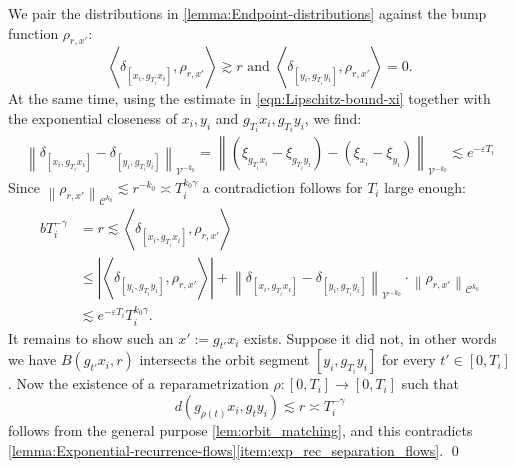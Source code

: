\documentclass[11pt]{amsart}
\newcommand \cC {\mathcal{C}}
\newcommand \cV {\mathcal{V}}
\newcommand{\ip}[1]{\left\langle#1\right\rangle}
\newcommand{\ve}{\varepsilon}
\newcommand{\leqapprox}{\lesssim}
\newcommand{\geqapprox}{\gtrsim}
\newcommand{\abs}[1]{\left|#1\right|}
\newcommand{\norm}[1]{\left\|#1\right\|}
\theoremstyle{mytheoremstyle}
\theoremstyle{mydefinitionstyle}
\theoremstyle{mytheoremstyle}
\numberwithin{equation}{section}
\theoremstyle{mydefinitionstyle}
\begin{document}
We pair the distributions in \autoref{lemma:Endpoint-distributions} against the bump function $\rho_{ r, x'}$:
\[
	\ip{\delta_{[x_i, g_{T_i}x_i]},\rho_{ r,x'}} \geqapprox r
	\text{ and }
	\ip{\delta_{[y_i, g_{T_i}y_i]},\rho_{ r,x'}} =0.
\]
At the same time, using the estimate in \autoref{eqn:Lipschitz-bound-xi} together with the exponential closeness of $x_i, y_i$ and $g_{T_i}x_i,g_{T_i}y_i$, we find:
\begin{align*}
	\norm{\delta_{[x_i,g_{T_i}x_i]} - \delta_{[y_i,g_{T_i}y_i]}}_{\cV^{-k_0}}
	= 
	\norm{\left(\xi_{g_{T_i}x_i} - \xi_{g_{T_i}y_i}\right)
	-
	\left(\xi_{x_i} - \xi_{y_i}\right)}_{\cV^{-k_0}}
	\leqapprox
	e^{-\ve T_i}
\end{align*}
Since $\norm{\rho_{ r,x'}}_{\cC^{k_0}}\leqapprox r^{-k_0}\asymp T_i^{k_0\gamma}$ a contradiction follows for $T_i$ large enough:
\begin{align*}
	 bT_i^{-\gamma} & = r 
	\leqapprox \ip{\delta_{[x_i, g_{T_i}x_i]},\rho_{ r,x'}}
	\\
	& \leq 
	\abs{\ip{\delta_{[y_i, g_{T_i}y_i]},\rho_{ r,x'}}}
	+
	\norm{\delta_{[x_i,g_{T_i}x_i]} - \delta_{[y_i,g_{T_i}y_i]}}_{\cV^{-k_0}}
	\cdot
	\norm{\rho_{ r,x'}}_{\cC^{k_0}}\\
	& \leqapprox
	e^{-\ve T_i}T_i^{k_0 \gamma}.
\end{align*}
It remains to show such an $x':=g_{t'}x_i$ exists.
Suppose it did not, in other words we have $B(g_{t'}x_i, r)$ intersects the orbit segment $[y_i, g_{T_i}y_i]$ for every $t'\in [0,T_i]$.
Now the existence of a reparametrization $\rho\colon [0,T_i]\to [0,T_i]$ such that
\[
	d(g_{\rho(t)} x_i, g_ty_i) \leqapprox r \asymp T_i^{-\gamma}
\]
follows from the general purpose \autoref{lem:orbit_matching}, and this contradicts \autoref{lemma:Exponential-recurrence-flows}\autoref{item:exp_rec_separation_flows}.
\hfill \qed
\end{document}
